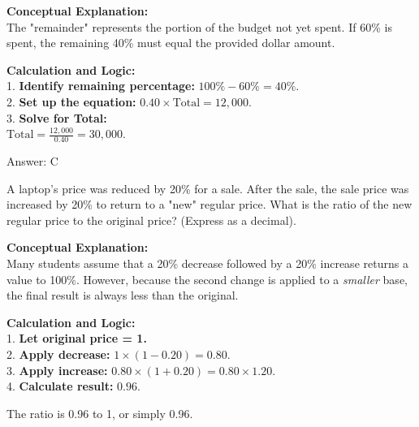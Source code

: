 \documentclass[11pt,paper=a4,answers]{exam}
\begin{document}
\begin{questions}
\begin{solution}
\textbf{Conceptual Explanation:} \\
The "remainder" represents the portion of the budget not yet spent. If 60\% is spent, the remaining 40\% must equal the provided dollar amount.

\vspace{30pt}

\textbf{Calculation and Logic:} \\
1. \textbf{Identify remaining percentage:} $100\% - 60\% = 40\%$. \\
2. \textbf{Set up the equation:} $0.40 \times \text{Total} = 12,000$. \\
3. \textbf{Solve for Total:} \\
   $\text{Total} = \frac{12,000}{0.40} = 30,000$.

\vspace{30pt}

Answer: \colorbox{yellow!100}{C}
\end{solution}

\vspace{60pt}

\question
A laptop's price was reduced by 20\% for a sale. After the sale, the sale price was increased by 20\% to return to a "new" regular price. What is the ratio of the new regular price to the original price? (Express as a decimal).

\begin{solution}
\textbf{Conceptual Explanation:} \\
Many students assume that a 20\% decrease followed by a 20\% increase returns a value to 100\%. However, because the second change is applied to a \textit{smaller} base, the final result is always less than the original.

\vspace{30pt}

\textbf{Calculation and Logic:} \\
1. \textbf{Let original price = 1.} \\
2. \textbf{Apply decrease:} $1 \times (1 - 0.20) = 0.80$. \\
3. \textbf{Apply increase:} $0.80 \times (1 + 0.20) = 0.80 \times 1.20$. \\
4. \textbf{Calculate result:} $0.96$.

\vspace{15pt}

The ratio is 0.96 to 1, or simply 0.96.


\end{solution}
\end{questions}
\end{document}
